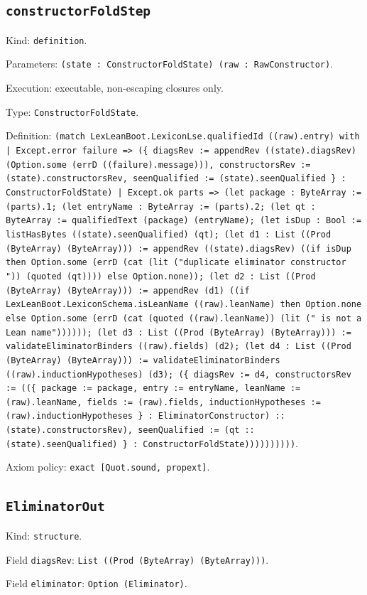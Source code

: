 \documentclass[11pt]{article}
\begin{document}
\subsection*{\texttt{constructorFoldStep}}
\noindent Kind: \texttt{definition}.\par
\noindent Parameters: \texttt{(state : ConstructorFoldState) (raw : RawConstructor)}.\par
\noindent Execution: executable, non-escaping closures only.\par
\noindent Type: \texttt{ConstructorFoldState}.\par
\noindent Definition: \texttt{(match LexLeanBoot.LexiconLse.qualifiedId ((raw).entry) with | Except.error failure => (\{ diagsRev := appendRev ((state).diagsRev) (Option.some (errD ((failure).message))), constructorsRev := (state).constructorsRev, seenQualified := (state).seenQualified \} : ConstructorFoldState) | Except.ok parts => (let package : ByteArray := (parts).1; (let entryName : ByteArray := (parts).2; (let qt : ByteArray := qualifiedText (package) (entryName); (let isDup : Bool := listHasBytes ((state).seenQualified) (qt); (let d1 : List ((Prod (ByteArray) (ByteArray))) := appendRev ((state).diagsRev) ((if isDup then Option.some (errD (cat (lit ("duplicate eliminator constructor ")) (quoted (qt)))) else Option.none)); (let d2 : List ((Prod (ByteArray) (ByteArray))) := appendRev (d1) ((if LexLeanBoot.LexiconSchema.isLeanName ((raw).leanName) then Option.none else Option.some (errD (cat (quoted ((raw).leanName)) (lit (" is not a Lean name")))))); (let d3 : List ((Prod (ByteArray) (ByteArray))) := validateEliminatorBinders ((raw).fields) (d2); (let d4 : List ((Prod (ByteArray) (ByteArray))) := validateEliminatorBinders ((raw).inductionHypotheses) (d3); (\{ diagsRev := d4, constructorsRev := ((\{ package := package, entry := entryName, leanName := (raw).leanName, fields := (raw).fields, inductionHypotheses := (raw).inductionHypotheses \} : EliminatorConstructor) :: (state).constructorsRev), seenQualified := (qt :: (state).seenQualified) \} : ConstructorFoldState))))))))))}.\par
\noindent Axiom policy: \texttt{exact [Quot.sound, propext]}.\par
\subsection*{\texttt{EliminatorOut}}
\noindent Kind: \texttt{structure}.\par
\noindent Field \texttt{diagsRev}: \texttt{List ((Prod (ByteArray) (ByteArray)))}.\par
\noindent Field \texttt{eliminator}: \texttt{Option (Eliminator)}.\par
\end{document}
